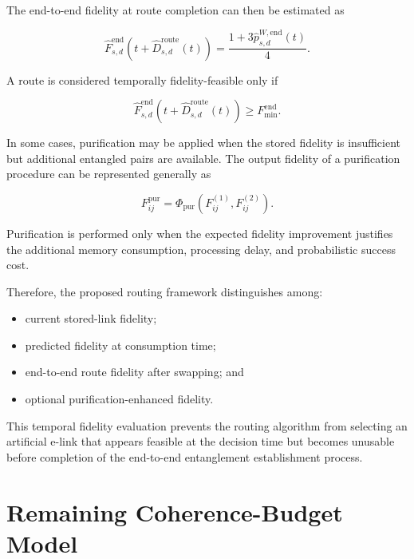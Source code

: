 The end-to-end fidelity at route completion can then be estimated as

\begin{equation}
    \widehat{F}_{s,d}^{\mathrm{end}}
    \left(
    t+
    \widehat{D}_{s,d}^{\mathrm{route}}(t)
    \right)
    =
    \frac{
    1+
    3\widehat{p}_{s,d}^{W,\mathrm{end}}(t)
    }{4}.
\end{equation}

A route is considered temporally fidelity-feasible only if

\begin{equation}
    \widehat{F}_{s,d}^{\mathrm{end}}
    \left(
    t+
    \widehat{D}_{s,d}^{\mathrm{route}}(t)
    \right)
    \geq
    F_{\min}^{\mathrm{end}}.
\end{equation}

In some cases, purification may be applied when the stored fidelity is insufficient but additional entangled pairs are available. The output fidelity of a purification procedure can be represented generally as

\begin{equation}
    F_{ij}^{\mathrm{pur}}
    =
    \Phi_{\mathrm{pur}}
    \left(
    F_{ij}^{(1)},
    F_{ij}^{(2)}
    \right).
\end{equation}

Purification is performed only when the expected fidelity improvement justifies the additional memory consumption, processing delay, and probabilistic success cost.

Therefore, the proposed routing framework distinguishes among:

\begin{itemize}
    \item current stored-link fidelity;
    \item predicted fidelity at consumption time;
    \item end-to-end route fidelity after swapping; and
    \item optional purification-enhanced fidelity.
\end{itemize}

This temporal fidelity evaluation prevents the routing algorithm from selecting an artificial e-link that appears feasible at the decision time but becomes unusable before completion of the end-to-end entanglement establishment process.
\section{Remaining Coherence-Budget Model}

